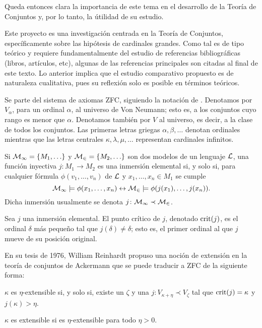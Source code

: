 \documentclass[12pt]{article}
\begin{document}
    Queda entonces clara la importancia de este tema en el desarrollo de la Teoría de Conjuntos y,
    por lo tanto, la útilidad de su estudio.

    Este proyecto es una investigación centrada en la Teoría de Conjuntos,
    específicamente sobre las hipótesis de cardinales grandes.
    Como tal es de tipo teórico y requiere fundamentalmente del estudio
    de referencias bibliográficas (libros, artículos, etc), algunas de las referencias principales son citadas
    al final de este texto.
    Lo anterior implica que el estudio comparativo propuesto es de naturaleza cualitativa,
    pues su reflexión solo es posible en términos teóricos.

    Se parte del sistema de axiomas ZFC, siguiendo la notación de \cite{kanamori_higher_2009}.
    Denotamos por $V_\alpha$, para un ordinal $\alpha$, al universo de Von Neumann; esto es,
    a los conjuntos cuyo rango es menor que $\alpha$. Denotamos también por $V$ al universo,
    es decir, a la clase de todos los conjuntos.
    Las primeras letras griegas $\alpha,\beta,\dots$ denotan ordinales mientras que las
    letras centrales $\kappa,\lambda,\mu,\dots$ representan cardinales infinitos.

    \begin{defi}
    Si $\model{M_1} = \set{M_1,\dots}$ y $\model{M_2} = \set{M_2,\dots}$ son dos modelos de un
    lenguaje $\mathcal { L }$, una función inyectiva $j\colon M_1\to M_2$ es una inmersión elemental si,
    y solo si, para cualquier fórmula $\phi(v_1,\dots,v_n)$ de $\mathcal { L }$ y $x_1,\dots,x_n\in M_1$ se cumple
    \[
        \mathcal { M_1 }\models \phi(x_1,\dots,x_n) \leftrightarrow \mathcal { M_2 }\models \phi(j(x_1),\dots,j(x_n)).
    \]
    Dicha inmersión usualmente se denota $j\colon \mathcal { M_1 }\prec\mathcal { M_2 }$.
    \end{defi}

    \begin{defi}
    Sea $j$ una inmersión elemental. El punto crítico de $j$, denotado $\mathrm { crit } ( j )$, es el ordinal $\delta$ más pequeño
    tal que $j(\delta)\neq\delta$; esto es, el primer ordinal al que $j$ mueve de su posición original.
    \end{defi}

    En su tesis de 1976, William Reinhardt \cite{reinhardt_ackermanns_1970} propuso una noción de extensión en
    la teoría de conjuntos de Ackermann \cite{ackermann_zur_1956} que se puede traducir a ZFC de la siguiente forma:
    \begin{defi}
        $\kappa$ es $\eta$-extensible si, y solo si, existe un $\zeta$ y una $j\colon V_{\kappa+\eta}\prec V_\zeta$
        tal que $\mathrm { crit } ( j ) = \kappa$ y $j(\kappa) > \eta$.
    \end{defi}
    \begin{defi}
        $\kappa$ es extensible si es $\eta$-extensible para todo $\eta>0$.
    \end{defi}
\end{document}
